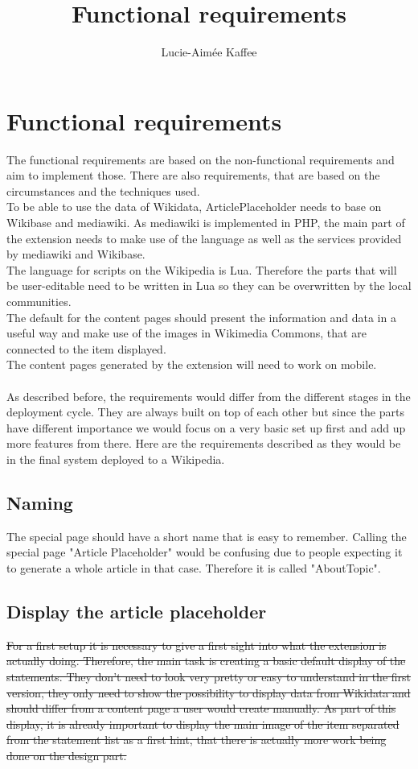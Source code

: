 \documentclass[11pt]{article}
\title {{Functional requirements}}
\author {Lucie-Aim\'{e}e Kaffee}
\date{}
\begin{document}
\listoftodos

\section {Functional requirements}
The functional requirements are based on the non-functional requirements and aim to implement those.
There are also requirements, that are based on the circumstances and the techniques used. \\
To be able to use the data of Wikidata, ArticlePlaceholder needs to base on Wikibase and mediawiki.
As mediawiki is implemented in PHP, the main part of the extension needs to make use of the language as well as the services provided by mediawiki and Wikibase. \\
The language for scripts on the Wikipedia is Lua. Therefore the parts that will be user-editable need to be written in Lua so they can be overwritten by the local communities. \\
The default for the content pages should present the information and data in a useful way and make use of the images in Wikimedia Commons, that are connected to the item displayed.\\
The content pages generated by the extension will need to work on mobile. \\
\\
As described before, the requirements would differ from the different stages in the deployment cycle. They are always built on top of each other but since the parts have different importance we would focus on a very basic set up first and add up more features from there. Here are the requirements described as they would be in the final system deployed to a Wikipedia.

%

\subsection{Naming}
The special page should have a short name that is easy to remember. Calling the special page "Article Placeholder" would be confusing due to people expecting it to generate a whole article in that case. Therefore it is called "AboutTopic".
\subsection{Display the article placeholder}
\st{For a first setup it is necessary to give a first sight into what the extension is actually doing. Therefore, the main task is creating a basic default display of the statements. They don't need to look very pretty or easy to understand in the first version, they only need to show the possibility to display data from Wikidata and should differ from a content page a user would create manually. As part of this display, it is already important to display the main image of the item separated from the statement list as a first hint, that there is actually more work being done on the design part.} \\
%
\end{document}
